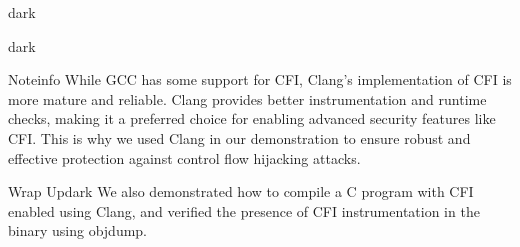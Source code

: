 \begin{baseBoxThree}{}{dark}
    \begin{baseBoxThree}{}{dark}
    \end{baseBoxThree}
    \smallskip
    \begin{baseBoxThree}{Note}{info}
        \smallskip
        While GCC has some support for CFI, Clang's implementation of CFI is more mature and reliable.
        Clang provides better instrumentation and runtime checks, making it a preferred choice for enabling advanced security features like CFI.
        This is why we used Clang in our demonstration to ensure robust and effective protection against control flow hijacking attacks.
        \smallskip
    \end{baseBoxThree}
    \smallskip
    \begin{baseBoxThree}{Wrap Up}{dark}
        \smallskip
        We also demonstrated how to compile a C program with CFI enabled using Clang, and verified the presence of CFI instrumentation in the binary using objdump.
        \smallskip
    \end{baseBoxThree}
    \smallskip
\end{baseBoxThree}
